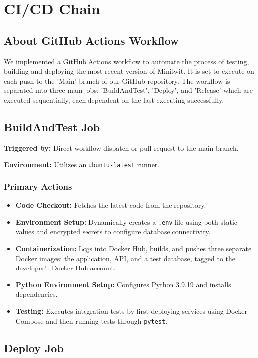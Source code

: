 \documentclass[12pt, a4paper]{book}
\begin{document}
\section{CI/CD Chain}

\subsection{About GitHub Actions Workflow}
We implemented a GitHub Actions workflow to automate the process of testing, building and deploying the most recent version of Minitwit. It is set to execute on each push to the 'Main' branch of our GitHub repository. The workflow is separated into three main jobs: 'BuildAndTest', 'Deploy', and 'Release' which are executed sequentially, each dependent on the last executing successfully.


\subsection{BuildAndTest Job}

\textbf{Triggered by:} Direct workflow dispatch or pull request to the main branch.

\textbf{Environment:} Utilizes an \texttt{ubuntu-latest} runner.

\subsubsection{Primary Actions}
\begin{itemize}
    \item \textbf{Code Checkout:} Fetches the latest code from the repository.
    \item \textbf{Environment Setup:} Dynamically creates a \texttt{.env} file using both static values and encrypted secrets to configure database connectivity.
    \item \textbf{Containerization:} Logs into Docker Hub, builds, and pushes three separate Docker images: the application, API, and a test database, tagged to the developer's Docker Hub account.
    \item \textbf{Python Environment Setup:} Configures Python 3.9.19 and installs dependencies.
    \item \textbf{Testing:} Executes integration tests by first deploying services using Docker Compose and then running tests through \texttt{pytest}.
\end{itemize}

\subsection{Deploy Job}
\end{document}
